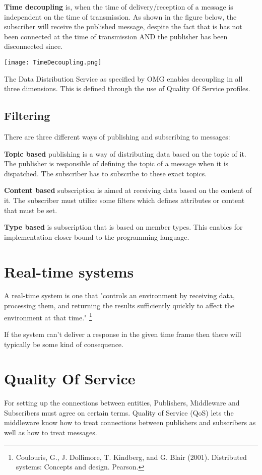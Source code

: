 \textbf{Time decoupling} is, when the time of delivery/reception of a message is independent on the time of transmission. As shown in the figure below, the subscriber will receive the published message, despite the fact that is has not been connected at the time of transmission AND the publisher has been disconnected since.

\begin{center}
	\texttt{[image: TimeDecoupling.png]}
\end{center}

The Data Distribution Service as specified by OMG enables decoupling in all three  dimensions. This is defined through the use of Quality Of Service profiles.

\subsection{Filtering}
There are three different ways of publishing and subscribing to messages:

\textbf{Topic based} publishing is a way of distributing data based on the topic of it. The publisher is responsible of defining the topic of a message when it is dispatched. The subscriber has to subscribe to these exact topics.

\textbf{Content based} subscription is aimed at receiving data based on the content of it. The subscriber must utilize some filters which defines attributes or content that must be set.

\textbf{Type based} is subscription that is based on member types. This enables for implementation closer bound to the programming language.


\section{Real-time systems}
A real-time system is one that "controls an environment by receiving data, processing them, and returning the results sufficiently quickly to affect the environment at that time." \footnote{Coulouris, G., J. Dollimore, T. Kindberg, and G. Blair (2001). Distributed systems: Concepts and design. Pearson.}

If the system can't deliver a response in the given time frame then there will typically be some kind of consequence.

\section{Quality Of Service}
For setting up the connections between entities, Publishers, Middleware and Subscribers must agree on certain terms. Quality of Service (QoS) lets the middleware know how to treat connections between publishers and subscribers as well as how to treat messages.

